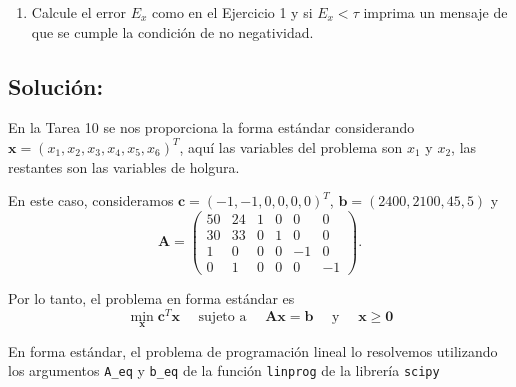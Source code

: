 \documentclass[11pt]{article}
\providecommand{\tightlist}{%
      \setlength{\itemsep}{0pt}\setlength{\parskip}{0pt}}
\begin{document}
\begin{enumerate}
\def\labelenumi{\arabic{enumi}.}
\setcounter{enumi}{3}
\tightlist
\item
  Calcule el error \(E_x\) como en el Ejercicio 1 y si \(E_x<\tau\)
  imprima un mensaje de que se cumple la condición de no negatividad.
\end{enumerate}

\hypertarget{soluciuxf3n}{%
\subsection{Solución:}\label{soluciuxf3n}}

    En la Tarea 10 se nos proporciona la forma estándar considerando
\(\mathbf{x}=(x_1,x_2,x_3,x_4,x_5,x_6)^T\), aquí las variables del
problema son \(x_1\) y \(x_2\), las restantes son las variables de
holgura.

En este caso, consideramos \(\mathbf{c}=(-1,-1,0,0,0,0)^T\),
\(\mathbf{b}=(2400,2100,45,5)\) y \[ 
\mathbf{A}=\begin{pmatrix}
50 & 24 & 1 & 0 & 0 & 0\\
30 & 33 & 0 & 1 & 0 & 0\\
1  &  0 & 0 & 0 &-1 & 0\\
0  &  1 & 0 & 0 & 0 &-1
\end{pmatrix}.
\]

Por lo tanto, el problema en forma estándar es \[ 
\min_{\mathbf{x}} \mathbf{c}^T\mathbf{x}\quad\text{ sujeto a }\quad \mathbf{A}\mathbf{x}=\mathbf{b}\quad\text{ y }\quad \mathbf{x}\geq \mathbf{0}
\]

En forma estándar, el problema de programación lineal lo resolvemos
utilizando los argumentos \texttt{A\_eq} y \texttt{b\_eq} de la función
\texttt{linprog} de la librería \texttt{scipy}
\end{document}
